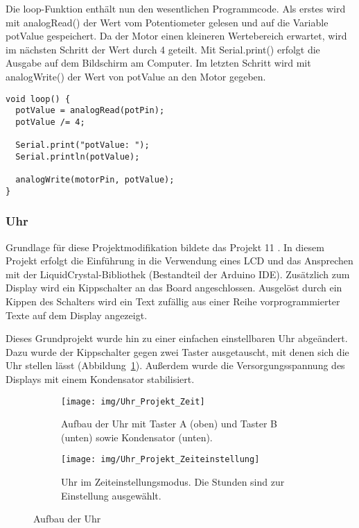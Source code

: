 Die loop-Funktion enthält nun den wesentlichen Programmcode. Als erstes wird mit analogRead() der Wert vom Potentiometer gelesen und auf die Variable potValue gespeichert. Da der Motor einen kleineren Wertebereich erwartet, wird im nächsten Schritt der Wert durch 4 geteilt. Mit Serial.print() erfolgt die Ausgabe auf dem Bildschirm am Computer. Im letzten Schritt wird mit analogWrite() der Wert von potValue an den Motor gegeben.
\begin{lstlisting}[language=Arduino]
void loop() {
  potValue = analogRead(potPin);
  potValue /= 4;

  Serial.print("potValue: ");
  Serial.println(potValue);

  analogWrite(motorPin, potValue);
}
\end{lstlisting}


\subsubsection{Uhr}
Grundlage für diese Projektmodifikation bildete das Projekt 11 \autocite{arduino}. In diesem Projekt erfolgt die Einführung in die Verwendung eines LCD und das Ansprechen mit der LiquidCrystal-Bibliothek (Bestandteil der Arduino IDE).
Zusätzlich zum Display wird ein Kippschalter an das Board angeschlossen. Ausgelöst durch ein Kippen des Schalters wird ein Text zufällig aus einer Reihe vorprogrammierter Texte auf dem Display angezeigt.

Dieses Grundprojekt wurde hin zu einer einfachen einstellbaren Uhr abgeändert. Dazu wurde der Kippschalter gegen zwei Taster ausgetauscht, mit denen sich die Uhr stellen lässt (Abbildung~\ref{fig:zeit}). Außerdem wurde die Versorgungsspannung des Displays mit einem Kondensator stabilisiert.

\begin{figure}[h]
    \centering
    \begin{subfigure}[b]{0.48\linewidth}
        \centering
        \texttt{[image: img/Uhr\_Projekt\_Zeit]}
        \caption{Aufbau der Uhr mit Taster A (oben) und Taster B (unten) sowie Kondensator (unten).}\label{fig:zeit}
    \end{subfigure}\enspace%
    \begin{subfigure}[b]{0.48\linewidth}
        \centering
        \texttt{[image: img/Uhr\_Projekt\_Zeiteinstellung]}
        \caption{Uhr im Zeiteinstellungsmodus. Die Stunden sind zur Einstellung ausgewählt.}\label{fig:zeiteinstell}
    \end{subfigure}
    \caption{Aufbau der Uhr}\label{fig:uhr}
\end{figure}

